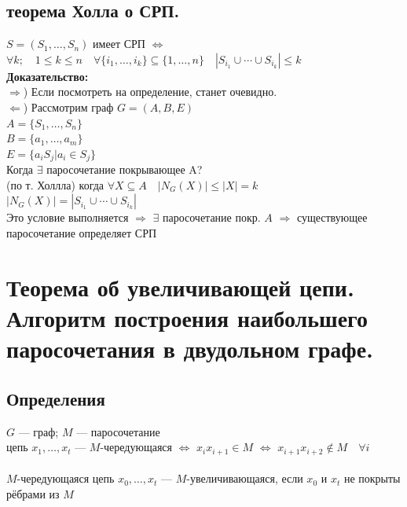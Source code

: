 \documentclass[12pt]{article}
\begin{document}
	\subsection{теорема Холла о СРП.}
		$S = (S_1,\dotsc,S_n)$ имеет СРП $\Leftrightarrow$ $\forall k; \quad 1 \leqslant k \leqslant n \quad \forall \{i_1,\dotsc,i_k\} \subseteq\{1,\dotsc,n\} \quad |S_{i_1} \cup \dotsb \cup S_{i_k}| \leqslant k$\\
		\textbf{Доказательство:}\\
			$\Rightarrow$) Если посмотреть на определение, станет очевидно.\\
			$\Leftarrow$) Рассмотрим граф $G = (A, B, E)$\\
			$A = \{S_1,\dotsc,S_n\}$\\
			$B = \{a_1,\dotsc,a_m\}$\\
			$E = \{a_iS_j | a_i \in S_j\}$\\
			Когда $\exists$ паросочетание покрывающее A?\\
			(по т. Холлла) когда $\forall X \subseteq A \quad |N_G(X)| \leqslant |X| = k$\\
			$|N_G(X)| = |S_{i_1} \cup \dotsb \cup S_{i_k}|$\\
			Это условие выполняется $\Rightarrow$ $\exists$ паросочетание покр. $A$ $\Rightarrow$ существующее паросочетание определяет СРП\\
		\qedsymbol
\section{Теорема об увеличивающей цепи. Алгоритм построения наибольшего паросочетания в двудольном графе.}
	\subsection{Определения}
			$G$ — граф; $M$ — паросочетание\\
			цепь $x_1,\dotsc,x_t$ — $M$-чередующаяся $\Leftrightarrow$ $x_ix_{i+1} \in M$ $\Leftrightarrow$ $x_{i+1}x_{i+2} \notin M \quad \forall i$\\\\
			$M$-чередующаяся цепь $x_0,\dotsc,x_t$ — $M$-увеличивающаяся, если $x_0$ и $x_t$ не покрыты рёбрами из $M$
\end{document}
